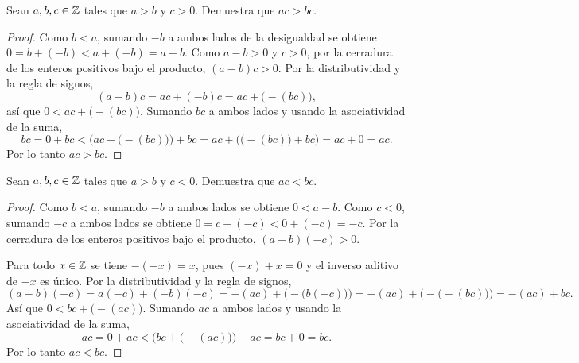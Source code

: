 \documentclass[12pt,a4paper]{article}
\begin{document}
    \thispagestyle{empty}
    

    \begin{problema}
        Sean $a,b,c\in\mathbb{Z}$ tales que $a>b$ y $c>0$. Demuestra que $ac>bc$.
    \end{problema}

    \begin{proof}
        Como $b<a$, sumando $-b$ a ambos lados de la desigualdad se obtiene $0=b+(-b)<a+(-b)=a-b$. Como $a-b>0$ y
        $c>0$, por la cerradura de los enteros positivos bajo el producto, $(a-b)c>0$. Por la distributividad y la
        regla de signos,
        \begin{equation*}
            (a-b)c=ac+(-b)c=ac+\big(-(bc)\big),
        \end{equation*}
        así que $0<ac+\big(-(bc)\big)$. Sumando $bc$ a ambos lados y usando la asociatividad de la suma,
        \begin{equation*}
            bc=0+bc<\Big(ac+\big(-(bc)\big)\Big)+bc=ac+\Big(\big(-(bc)\big)+bc\Big)=ac+0=ac.
        \end{equation*}
        Por lo tanto $ac>bc$.
    \end{proof}

    \begin{problema}
        Sean $a,b,c\in\mathbb{Z}$ tales que $a>b$ y $c<0$. Demuestra que $ac<bc$.
    \end{problema}

    \begin{proof}
        Como $b<a$, sumando $-b$ a ambos lados se obtiene $0<a-b$. Como $c<0$, sumando $-c$ a ambos lados se obtiene
        $0=c+(-c)<0+(-c)=-c$. Por la cerradura de los enteros positivos bajo el producto, $(a-b)(-c)>0$.

        Para todo $x\in\mathbb{Z}$ se tiene $-(-x)=x$, pues $(-x)+x=0$ y el inverso aditivo de $-x$ es único. Por la
        distributividad y la regla de signos,
        \begin{equation*}
            (a-b)(-c)=a(-c)+(-b)(-c)=-(ac)+\Big(-\big(b(-c)\big)\Big)=-(ac)+\Big(-\big(-(bc)\big)\Big)=-(ac)+bc.
        \end{equation*}
        Así que $0<bc+\big(-(ac)\big)$. Sumando $ac$ a ambos lados y usando la asociatividad de la suma,
        \begin{equation*}
            ac=0+ac<\Big(bc+\big(-(ac)\big)\Big)+ac=bc+0=bc.
        \end{equation*}
        Por lo tanto $ac<bc$.
    \end{proof}
\end{document}
